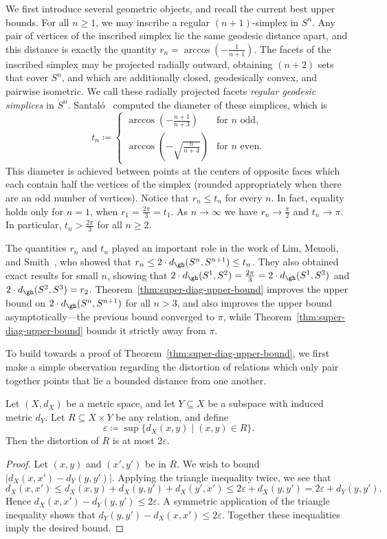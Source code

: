 \documentclass[11pt, reqno, english]{amsart}
\begin{document}
We first introduce several geometric objects, and recall the current best upper bounds.
For all $n\ge 1$, we may inscribe a regular $(n+1)$-simplex in $S^n$.
Any pair of vertices of the inscribed simplex lie the same geodesic distance apart, and this distance is exactly the quantity
$r_n = \arccos\left(-\frac{1}{n+1}\right)$.
The facets of the inscribed simplex may be projected radially outward, obtaining $(n+2)$ sets that cover $S^n$, and which are additionally closed, geodesically convex, and pairwise isometric.
We call these radially projected facets \emph{regular geodesic simplices} in $S^n$.
Santal\'o~\cite{santalo1946convexregions} computed the diameter of these simplices, which is \[
t_n \coloneqq \begin{cases}
\arccos\left(-\frac{n+1}{n+3}\right)&\text{for $n$ odd},\\
\arccos\left(-\sqrt{\frac{n}{n+4}}\right)& \text{for $n$ even}.
\end{cases}
\]
This diameter is achieved between points at the centers of opposite faces which each contain half the vertices of the simplex (rounded appropriately when there are an odd number of vertices).
Notice that $r_n \le t_n$ for every $n$.
In fact, equality holds only for $n=1$, when $r_1=\tfrac{2\pi}{3}=t_1$.
As $n\to \infty$ we have $r_n\to \tfrac{\pi}{2}$ and $t_n\to \pi$.
In particular, $t_n > \tfrac{2\pi}{3}$ for all $n\ge 2$.

The quantities $r_n$ and $t_n$ played an important role in the work of Lim, Memoli, and Smith~\cite{lim2021gromov}, who showed that $r_n \le 2\cdot d_\gh(S^n, S^{n+1}) \le t_n$.
They also obtained exact results for small $n$, showing that $2\cdot d_\gh(S^1,S^2) = \tfrac{2\pi}{3}= 2\cdot d_\gh(S^1, S^3)$ and $2\cdot d_\gh(S^2,S^3) = r_2$.
Theorem~\ref{thm:super-diag-upper-bound} improves the upper bound on $2\cdot d_\gh(S^n,S^{n+1})$ for all $n>3$, and also improves the upper bound asymptotically---the previous bound converged to $\pi$, while Theorem~\ref{thm:super-diag-upper-bound} bounds it strictly away from $\pi$.

To build towards a proof of Theorem~\ref{thm:super-diag-upper-bound}, we first make a simple observation regarding the distortion of relations which only pair together points that lie a bounded distance from one another.
\begin{lemma}
\label{lem:bounded-stretch}
Let $(X, d_X)$ be a metric space, and let $Y\subseteq X$ be a subspace with induced metric $d_Y$.
Let $R\subseteq X\times Y$ be any relation, and define
\[\varepsilon \coloneqq \sup\{d_X(x,y)\mid (x,y)\in R\}.\]
Then the distortion of $R$ is at most $2\varepsilon$.
\end{lemma}
\begin{proof}
Let $(x,y)$ and $(x',y')$ be in $R$.
We wish to bound $|d_X(x,x') - d_Y(y,y')|$.
Applying the triangle inequality twice, we see that
\[
d_X(x,x') \le d_X(x,y) + d_X(y,y') + d_X(y', x') \le 2\varepsilon + d_X(y,y') = 2\varepsilon + d_Y(y,y').
\]
Hence $d_X(x,x')-d_Y(y,y')\le 2\varepsilon$.
A symmetric application of the triangle inequality shows that $d_Y(y,y') - d_X(x,x') \le 2\varepsilon$.
Together these inequalities imply the desired bound.
\end{proof}
\end{document}
